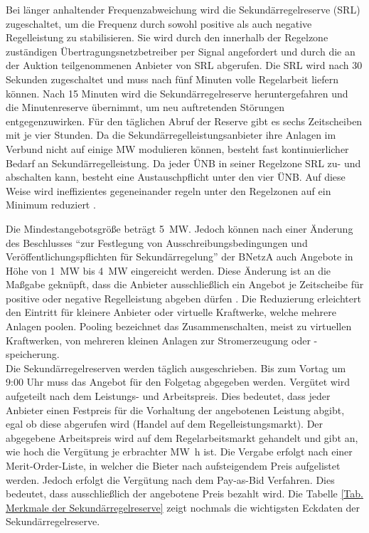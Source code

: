 			Bei länger anhaltender Frequenzabweichung wird die Sekundärregelreserve (SRL) zugeschaltet, um die Frequenz durch sowohl positive als auch negative Regelleistung zu stabilisieren.
			Sie wird durch den innerhalb der Regelzone zuständigen Übertragungsnetzbetreiber per Signal angefordert und durch die an der Auktion teilgenommenen Anbieter von SRL abgerufen. 
			Die SRL wird nach \num{30} Sekunden zugeschaltet und muss nach fünf Minuten volle Regelarbeit liefern können. 
			Nach \num{15} Minuten wird die Sekundärregelreserve heruntergefahren und die Minutenreserve übernimmt, um neu auftretenden Störungen entgegenzuwirken.
			Für den täglichen Abruf der Reserve gibt es sechs Zeitscheiben mit je vier Stunden.
			Da die Sekundärregelleistungsanbieter ihre Anlagen im Verbund nicht auf einige \si{\mega\watt} modulieren können, besteht fast kontinuierlicher Bedarf an Sekundärregelleistung.
			Da jeder ÜNB in seiner Regelzone SRL zu- und abschalten kann, besteht eine Austauschpflicht unter den vier ÜNB.
			Auf diese Weise wird ineffizientes gegeneinander regeln unter den Regelzonen auf ein Minimum reduziert \parencite{SRL_NextKraftwerke}. \\
			\clearpage
			
			Die Mindestangebotsgröße beträgt \SI{5}{\mega\watt}.
			Jedoch können nach einer Änderung des Beschlusses "`zur Festlegung von Ausschreibungsbedingungen und Veröffentlichungspflichten für Sekundärregelung"' der BNetzA auch Angebote in Höhe von \SI{1}{\mega\watt} bis \SI{4}{\mega\watt} eingereicht werden.
			Diese Änderung ist an die Maßgabe geknüpft, dass die Anbieter ausschließlich ein Angebot je Zeitscheibe für positive oder negative Regelleistung abgeben dürfen \parencite{Beschluss_SRL}.
			Die Reduzierung erleichtert den Eintritt für kleinere Anbieter oder virtuelle Kraftwerke, welche mehrere Anlagen poolen.
			Pooling bezeichnet das Zusammenschalten, meist zu virtuellen Kraftwerken, von mehreren kleinen Anlagen zur Stromerzeugung oder -speicherung. \\
			
			Die Sekundärregelreserven werden täglich ausgeschrieben. 
			Bis zum Vortag um 9:00 Uhr muss das Angebot für den Folgetag abgegeben werden.
			Vergütet wird aufgeteilt nach dem Leistungs- und Arbeitspreis.
			Dies bedeutet, dass jeder Anbieter einen Festpreis für die Vorhaltung der angebotenen Leistung abgibt, egal ob diese abgerufen wird (Handel auf dem Regelleistungsmarkt).
			Der abgegebene Arbeitspreis wird auf dem Regelarbeitsmarkt gehandelt und gibt an, wie hoch die Vergütung je erbrachter \si{\mega\watt\hour} ist.
			Die Vergabe erfolgt nach einer Merit-Order-Liste, in welcher die Bieter nach aufsteigendem Preis aufgelistet werden.
			Jedoch erfolgt die Vergütung nach dem Pay-as-Bid Verfahren.
			Dies bedeutet, dass ausschließlich der angebotene Preis bezahlt wird.
			Die Tabelle \ref{Tab. Merkmale der Sekundärregelreserve} zeigt nochmals die wichtigsten Eckdaten der Sekundärregelreserve.
			
